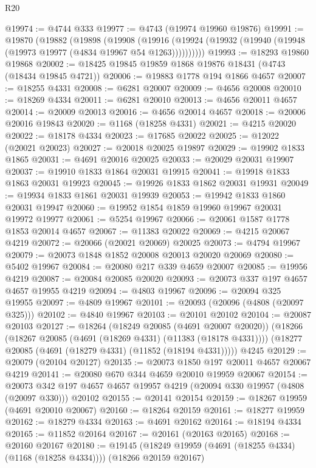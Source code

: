 \begin{lexlean}{R20}
\begin{coremodule}
@19974 := @4744 @333
@19977 := @4743 (@19974 @19960 @19876)
@19991 := @19870
    (@19882
      (@19898
        (@19908
          (@19916 (@19924 (@19932 (@19940 (@19948 (@19973 @19977 (@4834 @19967 @54 @1263))))))))))
@19993 := @18293 @19860 @19868
@20002 := @18425 @19845 @19859 @1868 @19876 @18431 (@4743 (@18434 @19845 @4721))
@20006 := @19883 @1778 @194 @1866 @4657
@20007 := @18255 @4331
@20008 := @6281 @20007
@20009 := @4656 @20008
@20010 := @18269 @4334
@20011 := @6281 @20010
@20013 := @4656 @20011 @4657
@20014 := @20009 @20013
@20016 := @4656 @20014 @4657
@20018 := @20006 @20016 @19843
@20020 := @1168 (@18258 @4331)
@20021 := @4215 @20020
@20022 := @18178 @4334
@20023 := @17685 @20022
@20025 := @12022 (@20021 @20023)
@20027 := @20018 @20025 @19897
@20029 := @19902 @1833 @1865
@20031 := @4691 @20016 @20025
@20033 := @20029 @20031 @19907
@20037 := @19910 @1833 @1864 @20031 @19915
@20041 := @19918 @1833 @1863 @20031 @19923
@20045 := @19926 @1833 @1862 @20031 @19931
@20049 := @19934 @1833 @1861 @20031 @19939
@20053 := @19942 @1833 @1860 @20031 @19947
@20060 := @19952 @1854 @1859 @19960 @19967 @20031 @19972 @19977
@20061 := @5254 @19967
@20066 := @20061 @1587 @1778 @1853 @20014 @4657
@20067 := @11383 @20022
@20069 := @4215 @20067 @4219
@20072 := @20066 (@20021 @20069) @20025
@20073 := @4794 @19967
@20079 := @20073 @1848 @1852 @20008 @20013 @20020 @20069
@20080 := @5402 @19967
@20084 := @20080 @217 @339 @4659 @20007
@20085 := @19956 @4219
@20087 := @20084 @20085 @20020
@20093 := @20073 @337 @197 @4657 @4657 @19955 @4219
@20094 := @4803 @19967
@20096 := @20094 @325 @19955
@20097 := @4809 @19967
@20101 := @20093 (@20096 (@4808 (@20097 @325)))
@20102 := @4840 @19967
@20103 := @20101 @20102
@20104 := @20087 @20103
@20127 := @18264
    (@18249 @20085 (@4691 @20007 @20020))
    (@18266
      (@18267 @20085 (@4691 (@18269 @4331) (@11383 (@18178 @4331))))
      (@18277 @20085 (@4691 (@18279 @4331) (@11852 (@18194 @4331)))))
    @4245
@20129 := @20079 (@20104 @20127)
@20135 := @20073 @1850 @197 @20011 @4657 @20067 @4219
@20141 := @20080 @670 @344 @4659 @20010 @19959 @20067
@20154 := @20073
    @342
    @197
    @4657
    @4657
    @19957
    @4219
    (@20094 @330 @19957 (@4808 (@20097 @330)))
    @20102
@20155 := @20141 @20154
@20159 := @18267 @19959 (@4691 @20010 @20067)
@20160 := @18264 @20159
@20161 := @18277 @19959
@20162 := @18279 @4334
@20163 := @4691 @20162
@20164 := @18194 @4334
@20165 := @11852 @20164
@20167 := @20161 (@20163 @20165)
@20168 := @20160 @20167
@20180 := @19145
    (@18249 @19959 (@4691 (@18255 @4334) (@1168 (@18258 @4334))))
    (@18266 @20159 @20167)

\end{coremodule}
\end{lexlean}
